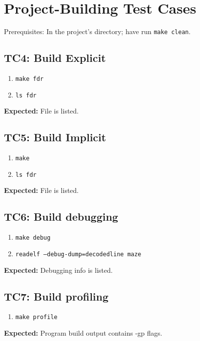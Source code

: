 \documentclass[11pt]{report}
\def\dirname{fdr}
\begin{document}
\section*{Project-Building Test Cases}
Prerequisites: In the project's directory; have run {\texttt{\color{MidnightBlue}make clean}}.
\subsection*{TC4: Build Explicit}
\begin{enumerate}
  \item {\texttt{\color{MidnightBlue}make \dirname}}
  \item {\texttt{\color{MidnightBlue}ls \dirname}}
\end{enumerate}
\textbf{Expected:} File is listed.
\subsection*{TC5: Build Implicit}
\begin{enumerate}
  \item {\texttt{\color{MidnightBlue}make}}
  \item {\texttt{\color{MidnightBlue}ls \dirname}}
\end{enumerate}
\textbf{Expected:} File is listed.
\subsection*{TC6: Build debugging}
\begin{enumerate}
  \item {\texttt{\color{MidnightBlue}make debug}}
  \item {\texttt{\color{MidnightBlue}readelf --debug-dump=decodedline maze}}
\end{enumerate}
\textbf{Expected:} Debugging info is listed.
\subsection*{TC7: Build profiling}
\begin{enumerate}
  \item {\texttt{\color{MidnightBlue}make profile}}
\end{enumerate}
\textbf{Expected:} Program build output contains -gp flags.
\end{document}
